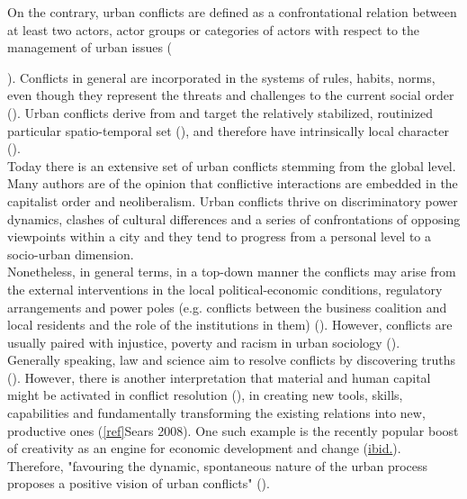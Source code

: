\documentclass[11pt]{report}
\begin{document}
{{{On the contrary, urban conflicts are defined as a confrontational relation between at least two actors, actor groups or categories of actors with respect to the management of urban issues (\href{ref}{\citealt{Aznar et al. 2006}} {\href{ref}{\citealt{Renau and Lozano 2016}}).
Conflicts in general are incorporated in the systems of rules, habits, norms, even though they represent the threats and challenges to the current social order (\cite{Sears and Cairn 2005}).
Urban conflicts derive from and target the relatively stabilized, routinized particular spatio-temporal set (\citealt{Brenner and Theodore 2005}), and therefore have intrinsically local character (\href{Sassen}{\citealt{sassen_toward_2007}}).
\\

Today there is an extensive set of urban conflicts stemming from the global level.
Many authors are of the opinion that conflictive interactions are embedded in the capitalist order and neoliberalism.
Urban conflicts thrive on discriminatory power dynamics, clashes of cultural differences and a series of confrontations of opposing viewpoints within a city and they tend to progress from a personal level to a socio-urban dimension.
\\

Nonetheless, in general terms, in a top-down manner the conflicts may arise from the external interventions in the local political-economic conditions, regulatory arrangements and power poles (e.g. conflicts between the business coalition and local residents and the role of the institutions in them) (\cite{Brenner and Theodore}).
However, conflicts are usually paired with injustice, poverty and racism in urban sociology (\cite{Hubbard 2004}).
\\

Generally speaking, law and science aim to resolve conflicts by discovering truths (\cite{Brenner and Theodore}).
However, there is another interpretation that material and human capital might be activated in conflict resolution (\href{Coleman}{\citealt{coleman_social_1988}}), in creating new tools, skills, capabilities and fundamentally transforming the existing relations into new, productive ones (\ref{ref}{Sears 2008}).
One such example is the recently popular boost of creativity as an engine for economic development and change (\href{Sears}{ibid.}).
Therefore, "favouring the dynamic, spontaneous nature of the urban process proposes a positive vision of urban conflicts" 
(\href{Sevilla-Buitrago}{\citealt{evilla-buitrago_debating_2013}}).

}}}}
\end{document}
